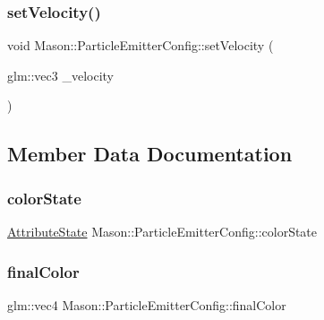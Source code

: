 \subsubsection{\texorpdfstring{set\+Velocity()}{setVelocity()}}
{\footnotesize\ttfamily void Mason\+::\+Particle\+Emitter\+Config\+::set\+Velocity (\begin{DoxyParamCaption}\item[{glm\+::vec3}]{\+\_\+velocity }\end{DoxyParamCaption})\hspace{0.3cm}{\ttfamily [inline]}}



\subsection{Member Data Documentation}
\hypertarget{struct_mason_1_1_particle_emitter_config_a94ad732500966a699dcead307033269a}{}\label{struct_mason_1_1_particle_emitter_config_a94ad732500966a699dcead307033269a} 
\subsubsection{\texorpdfstring{color\+State}{colorState}}
{\footnotesize\ttfamily \hyperlink{namespace_mason_aefc2ce7d9295b57af46ab6c8ebfc32f7}{Attribute\+State} Mason\+::\+Particle\+Emitter\+Config\+::color\+State}

\hypertarget{struct_mason_1_1_particle_emitter_config_addf94f6df6c784495840b93aa30ce162}{}\label{struct_mason_1_1_particle_emitter_config_addf94f6df6c784495840b93aa30ce162} 
\subsubsection{\texorpdfstring{final\+Color}{finalColor}}
{\footnotesize\ttfamily glm\+::vec4 Mason\+::\+Particle\+Emitter\+Config\+::final\+Color}

\hypertarget{struct_mason_1_1_particle_emitter_config_a37a579321019d25bdb1ecf4f32353d7c}{}\label{struct_mason_1_1_particle_emitter_config_a37a579321019d25bdb1ecf4f32353d7c} 
